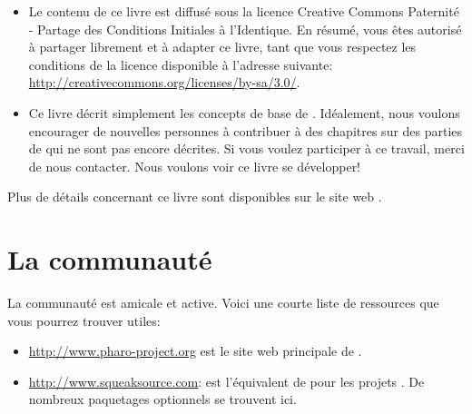 \documentclass[a4paper,10pt,twoside]{book}
\begin{document}
\begin{itemize}

\item	Le contenu de ce livre est diffusé sous la licence Creative Commons Paternité - Partage des Conditions Initiales à l'Identique.
		En résumé, vous êtes autorisé à partager librement et à adapter ce livre, tant que vous respectez les conditions de la licence disponible à l'adresse suivante: 
		\url{http://creativecommons.org/licenses/by-sa/3.0/}.

\item	Ce livre décrit simplement les concepts de base de \pharo.
		Idéalement, nous voulons encourager de nouvelles personnes à contribuer à des chapitres sur des parties de \pharo qui ne sont pas encore décrites.
		Si vous voulez participer à ce travail, merci de nous contacter. Nous voulons voir ce livre se développer!
\end{itemize}

Plus de détails concernant ce livre sont disponibles sur le site web \ppe.

\section*{La communauté \pharo}

La communauté \pharo est amicale et active.
Voici une courte liste de ressources que vous pourrez trouver utiles:

\begin{itemize}
\item \url{http://www.pharo-project.org} est le site web principale de \pharo.
\item \url{http://www.squeaksource.com}: \squeaksource est l'équivalent de
  \sourceforge pour les projets \pharo. De nombreux paquetages optionnels se trouvent ici.
\end{itemize}



\end{document}
